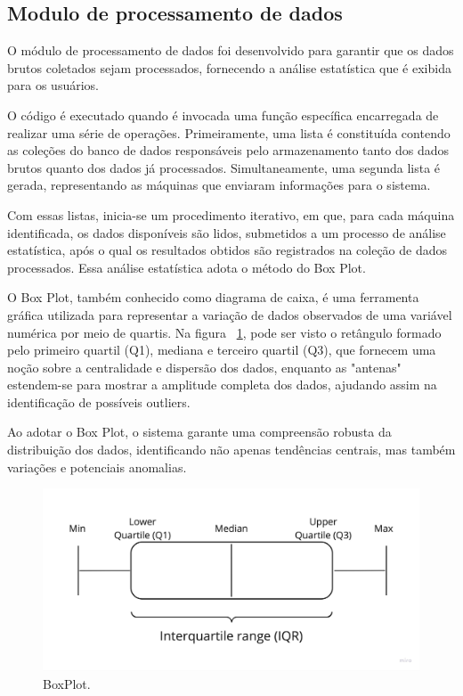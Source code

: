 \subsection{Modulo de processamento de dados}\label{subsec:moduloProcessamento}
O módulo de processamento de dados foi desenvolvido para garantir que os dados brutos coletados sejam processados, fornecendo a análise estatística que é exibida para os usuários.

O código é executado quando é invocada uma função específica encarregada de realizar uma série de operações. Primeiramente, uma lista é constituída contendo as coleções do banco de dados responsáveis pelo armazenamento tanto dos dados brutos quanto dos dados já processados. Simultaneamente, uma segunda lista é gerada, representando as máquinas que enviaram informações para o sistema.

Com essas listas, inicia-se um procedimento iterativo, em que, para cada máquina identificada, os dados disponíveis são lidos, submetidos a um processo de análise estatística, após o qual os resultados obtidos são registrados na coleção de dados processados. Essa análise estatística adota o método do Box Plot.

O Box Plot, também conhecido como diagrama de caixa, é uma ferramenta gráfica utilizada para representar a variação de dados observados de uma variável numérica por meio de quartis. Na figura ~\ref{fig:boxplot}, pode ser visto o retângulo formado pelo primeiro quartil (Q1), mediana e terceiro quartil (Q3), que fornecem uma noção sobre a centralidade e dispersão dos dados, enquanto as "antenas" estendem-se para mostrar a amplitude completa dos dados, ajudando assim na identificação de possíveis outliers.

Ao adotar o Box Plot, o sistema garante uma compreensão robusta da distribuição dos dados, identificando não apenas tendências centrais, mas também variações e potenciais anomalias.

\begin{figure}[htbp]
	\centering
	\includegraphics[width=\textwidth]{images/boxplot.jpg}
	\caption{BoxPlot.}
	\label{fig:boxplot}
\end{figure}


